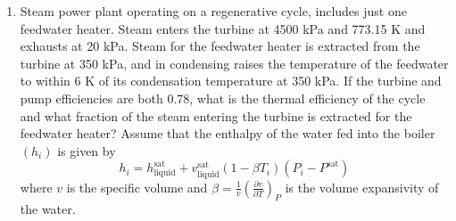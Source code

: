 \documentclass[12pts,a4paper,amsmath,amssymb,floatfix]{article}%
\newcommand{\frc}{\displaystyle\frac}
\begin{document}
\begin{enumerate}[label=\bfseries Problem \arabic*]
\item \label{P:example8_9}Steam power plant operating on a regenerative cycle, includes just one feedwater heater. Steam enters the turbine at 4500 kPa and 773.15 K and exhausts at 20 kPa. Steam for the feedwater heater is extracted from the turbine at 350 kPa, and in condensing raises the temperature of the feedwater to within 6 K of its condensation temperature at 350 kPa. If the turbine and pump efficiencies are both 0.78, what is the thermal efficiency of the cycle and what fraction of the steam entering the turbine is extracted for the feedwater heater? Assume that the enthalpy of the water fed into the boiler $\left(h_{i}\right)$ is given by
\begin{displaymath}
h_{i} = h_{\text{liquid}}^{\text{sat}} + v_{\text{liquid}}^{\text{sat}}\left(1-\beta T_{i}\right)\left(P_{i}-P^{\text{sat}}\right) 
\end{displaymath} 
where $v$ is the specific volume and $\beta=\frc{1}{v}\left(\frc{\partial v}{\partial T}\right)_{P}$ is the volume expansivity of the water.

\end{enumerate}



\clearpage

%
\end{document}
